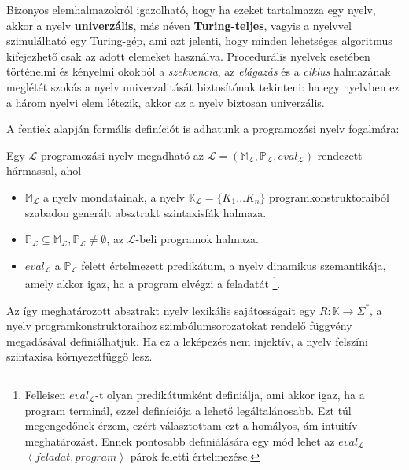 Bizonyos elemhalmazokról igazolható, hogy ha ezeket tartalmazza egy nyelv, akkor a nyelv \textbf{univerzális}, más néven \textbf{Turing-teljes}, vagyis a nyelvvel szimulálható egy Turing-gép, ami azt jelenti, hogy minden lehetséges algoritmus kifejezhető csak az adott elemeket használva.
Procedurális nyelvek esetében történelmi és kényelmi okokból a \textit{szekvencia}, az \textit{elágazás} és a \textit{ciklus} halmazának meglétét szokás a nyelv univerzalitását biztosítónak tekinteni: ha egy nyelvben ez a három nyelvi elem létezik, akkor az a nyelv biztosan univerzális\cite{Fothi}.

\bigskip

\noindent A fentiek alapján formális definíciót is adhatunk a programozási nyelv fogalmára:
\begin{defn}
	Egy $\mathcal{L}$ programozási nyelv megadható az $\mathcal{L} = (
		\mathbb{M}_\mathcal{L},
		\mathbb{P}_\mathcal{L},
		eval_\mathcal{L}
	)$ rendezett hármassal, ahol
	\begin{itemize}
		\item $\mathbb{M}_\mathcal{L}$ a nyelv mondatainak, a nyelv $\mathbb{K}_\mathcal{L} = \{K_1 \ldots K_n\}$ programkonstruktoraiból szabadon generált absztrakt szintaxisfák halmaza.
		\item $\mathbb{P}_\mathcal{L} \subseteq \mathbb{M}_\mathcal{L}, \mathbb{P}_\mathcal{L} \not= \emptyset$, az $\mathcal{L}$-beli programok halmaza.
		\item $eval_{\mathcal{L}}$ a $\mathbb{P}_\mathcal{L}$ felett értelmezett predikátum, a nyelv dinamikus szemantikája, amely akkor igaz, ha a program elvégzi a feladatát%
		\footnote{
Felleisen $eval_\mathcal{L}$-t olyan predikátumként definiálja, ami akkor igaz, ha a program terminál\cite{Felleisen90}, ezzel  definíciója a lehető legáltalánosabb. Ezt túl megengedőnek érzem, ezért választottam ezt a homályos, ám intuitív meghatározást. Ennek pontosabb definiálására egy mód lehet az $eval_\mathcal{L}$ $\left<feladat, program\right>$ párok feletti értelmezése.
		}.
	\end{itemize}

	\normalfont Az így meghatározott absztrakt nyelv lexikális sajátosságait egy $R: \mathbb{K} \rightarrow \Sigma^*$, a nyelv programkonstruktoraihoz szimbólumsorozatokat rendelő függvény megadásával definiálhatjuk. Ha ez a leképezés nem injektív, a nyelv felszíni szintaxisa környezetfüggő lesz.
\end{defn}


